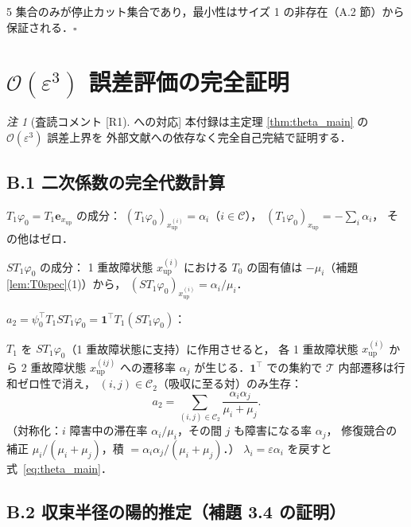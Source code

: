 \documentclass[12pt,a4paper]{article}
\theoremstyle{plain}
\theoremstyle{definition}
\theoremstyle{remark}
\newtheorem{remark}[theorem]{注}
\newcommand{\calO}{\mathcal{O}}
\newcommand{\calT}{\mathcal{T}}
\newcommand{\calC}{\mathcal{C}}
\newcommand{\eps}{\varepsilon}
\newcommand{\RedRes}{S}
\newcommand{\calCtwo}{\mathcal{C}_2}
\begin{document}
5 集合のみが停止カット集合であり，最小性はサイズ 1 の非存在（A.2 節）から保証される．\hfill$\square$

\section{$\calO(\eps^3)$ 誤差評価の完全証明}\label{app:error}

\begin{remark}[査読コメント [R1] への対応]
  本付録は主定理 \ref{thm:theta_main} の $\calO(\eps^3)$ 誤差上界を
  外部文献への依存なく完全自己完結で証明する．
\end{remark}

\subsection*{B.1 二次係数の完全代数計算}

$T_1\varphi_0 = T_1\mathbf{e}_{x_{\mathrm{up}}}$ の成分：
$(T_1\varphi_0)_{x_{\mathrm{up}}^{(i)}}=\alpha_i$（$i\in\calC$），
$(T_1\varphi_0)_{x_{\mathrm{up}}}=-\sum_i\alpha_i$，
その他はゼロ．

$\RedRes T_1\varphi_0$ の成分：
1 重故障状態 $x_{\mathrm{up}}^{(i)}$ における $T_0$ の固有値は $-\mu_i$（補題 \ref{lem:T0spec}(1)）から，
$(\RedRes T_1\varphi_0)_{x_{\mathrm{up}}^{(i)}} = \alpha_i/\mu_i$．

$a_2 = \psi_0^\top T_1\RedRes T_1\varphi_0 = \mathbf{1}^\top T_1(\RedRes T_1\varphi_0)$：

$T_1$ を $\RedRes T_1\varphi_0$（1 重故障状態に支持）に作用させると，
各 1 重故障状態 $x_{\mathrm{up}}^{(i)}$ から 2 重故障状態 $x_{\mathrm{up}}^{(ij)}$ への遷移率 $\alpha_j$
が生じる．$\mathbf{1}^\top$ での集約で $\calT$ 内部遷移は行和ゼロ性で消え，
$(i,j)\in\calCtwo$（吸収に至る対）のみ生存：
\begin{equation}
  a_2 = \sum_{(i,j)\in\calCtwo}\frac{\alpha_i\alpha_j}{\mu_i+\mu_j}.
  \label{eq:a2proof}
\end{equation}
（対称化：$i$ 障害中の滞在率 $\alpha_i/\mu_i$，その間 $j$ も障害になる率 $\alpha_j$，
修復競合の補正 $\mu_i/(\mu_i+\mu_j)$，積 $= \alpha_i\alpha_j/(\mu_i+\mu_j)$．）
$\lambda_i=\eps\alpha_i$ を戻すと式~\eqref{eq:theta_main}．

\subsection*{B.2 収束半径の陽的推定（補題 3.4 の証明）}
\end{document}
